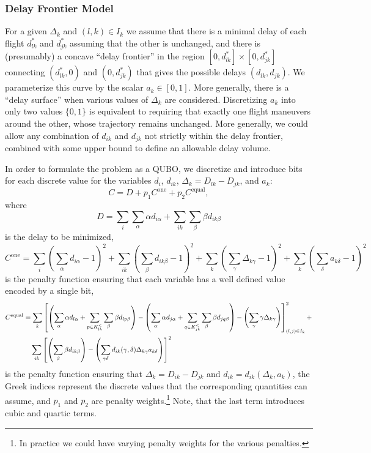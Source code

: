 \documentclass{article}
\begin{document}
\subsubsection{Delay Frontier Model}
For a given $\Delta_{k}$ and $(l, k) \in I_k$ we assume that there is a minimal delay of each flight $d_{lk}^*$ and $d_{jk}^*$ assuming that the other is unchanged, and there is (presumably) a concave ``delay frontier'' in the region $[0, d_{lk}^*] \times [0, d_{jk}^*]$ connecting $(d_{lk}^*, 0)$ and $(0, d_{jk}^*)$ that gives the possible delays $(d_{lk}, d_{jk})$. 
We parameterize this curve by the scalar $a_{k} \in [0, 1]$.
More generally, there is a ``delay surface'' when various values of $\Delta_{k}$ are considered.
Discretizing $a_k$ into only two values $\{0, 1\}$ is equivalent to requiring that exactly one flight maneuvers around the other, whose trajectory remains unchanged.
More generally, we could allow any combination of $d_{ik}$ and $d_{jk}$ not strictly within the delay frontier, combined with some upper bound to define an allowable delay volume.

In order to formulate the problem as a QUBO, we discretize and introduce bits for each discrete value for the variables $d_i$, $d_{ik}$, $\Delta_k = D_{lk} - D_{jk}$, and $a_k$:
\begin{equation*}
  C = D + p_1 C^{\mathrm{one}} + p_2 C^{\mathrm{equal}},
\end{equation*}
where 
\begin{equation*}
  D = 
  \sum_{i} \sum_{\alpha} \alpha d_{i\alpha}
  +
  \sum_{ik} \sum_{\beta} \beta d_{ik\beta}
\end{equation*}
is the delay to be minimized,
\begin{equation*}
  C^{\mathrm{one}}
  =
  \sum_i \left(\sum_{\alpha} d_{i\alpha}- 1 \right)^2 
  +
  \sum_{ik} \left(\sum_{\beta} d_{ik\beta} - 1\right)^2
  +
  \sum_{k} \left(\sum_{\gamma} \Delta_{k\gamma} - 1\right)^2
  +
  \sum_{k} \left(\sum_{\delta} a_{k\delta}- 1\right)^2
\end{equation*}
is the penalty function ensuring that each variable has a well defined value encoded by a single bit,
\begin{align*}
  C^{\mathrm{equal}}
  &=
  \sum_{k} \left[
    \left(\sum_{\alpha} \alpha d_{l\alpha} + \sum_{p \in K^<_{lk}} \sum_{\beta} \beta d_{lp\beta}\right)
    -
    \left(\sum_{\alpha} \alpha d_{j\alpha} + \sum_{q \in K^<_{jk}} \sum_{\beta} \beta d_{jq\beta}\right)
    -
  \left(\sum_{\gamma} \gamma \Delta_{k\gamma}\right)\right]_{(l, j) \in I_k }^2
  + \\
  &\hphantom{=,}
  \sum_{ik} \left[
    \left(\sum_{\beta} \beta d_{ik\beta}\right) - 
  \left(\sum_{\gamma \delta} d_{ik} (\gamma, \delta) \Delta_{k\gamma} a_{k\delta}\right)\right]^2
\end{align*}
is the penalty function ensuring that $\Delta_k = D_{ik} - D_{jk}$ and $d_{ik} = d_{ik}(\Delta_k, a_k)$, 
the Greek indices represent the discrete values that the corresponding quantities can assume, and $p_1$ and $p_2$ are penalty weights.\footnote{In practice we could have varying penalty weights for the various penalties.}
Note, that the last term introduces cubic and quartic terms.
\end{document}
